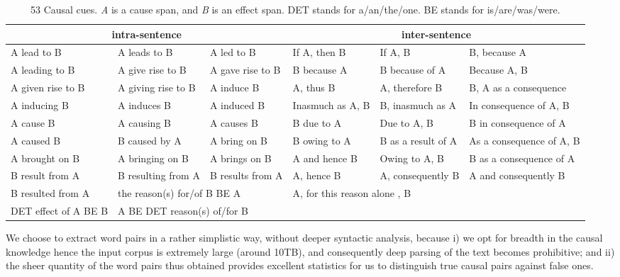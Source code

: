 \begin{table*}[th]
\centering
\caption{53 Causal cues. \textit{A} is a cause span, and \textit{B} is an effect span.
DET stands for a/an/the/one. BE stands for is/are/was/were.}
\label{tab:cue}
\begin{tabular}{|l l l|l l l|}
\hline \multicolumn{3}{|c|}{intra-sentence} & \multicolumn{3}{c|}{inter-sentence}\\
\hline \hline
A lead to B & A leads to B & A led to B & If A, then B& If A, B & B, because A \\
A leading to B & A give rise to B & A gave rise to B & B because A & B because of A & Because A, B \\
A given rise to B & A giving rise to B & A induce B & A, thus B & A, therefore B & B, A as a consequence \\
A inducing B & A induces B & A induced B & Inasmuch as A, B & B, inasmuch as A & In consequence of A, B \\
A cause B & A causing B & A causes B & B due to A & Due to A, B & B in consequence of A \\
A caused B & B caused by A & A bring on B & B owing to A & B as a result of A & As a consequence of A, B\\
A brought on B & A bringing on B & A brings on B & A and hence B & Owing to A, B& B as a consequence of A\\
B result from A & B resulting from A &  B results from A & A, hence B & A, consequently B & A and consequently B\\
B resulted from A & \multicolumn{2}{l|}{the reason(s) for/of B BE A} & \multicolumn{3}{|l|}{A, for this reason alone , B} \\
DET effect of A BE B &\multicolumn{2}{l|}{A BE DET reason(s) of/for B} & & & \\
\hline
\end{tabular}
\end{table*}

We choose to extract word pairs in a rather simplistic way, without deeper
syntactic analysis, because i) we opt for breadth in the causal knowledge
hence the input corpus is extremely large (around 10TB), and consequently
deep parsing of the text becomes prohibitive; and ii) the sheer quantity of
the word pairs thus obtained provides excellent statistics for us to
distinguish true causal pairs against false ones.

